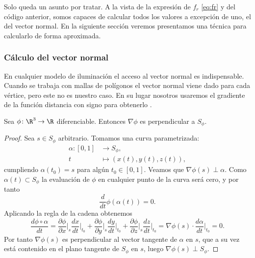 Solo queda un asunto por tratar. A la vista de la expresión de $f_r$ \eqref{eq:fr} y del código anterior, somos capaces de calcular todos los valores a excepción de uno, el del vector normal. En la siguiente sección veremos presentamos una técnica para calcularlo de forma aproximada. 

\subsubsection{Cálculo del vector normal}
En cualquier modelo de iluminación el acceso al vector normal es indispensable. Cuando se trabaja con mallas de polígonos el vector normal viene dado para cada vértice, pero este no es nuestro caso. En su lugar nosotros usaremos el gradiente de la función distancia con signo para obtenerlo \cite{harvard}.
\begin{proposicion}\label{p:gradient_perp}
  Sea $\phi\colon \R^3\to \R$ diferenciable. Entonces $\nabla\phi$ es perpendicular a $S_\phi$.
\end{proposicion}
\begin{proof}
  Sea $s\in S_\phi$ arbitrario. Tomamos una curva parametrizada:
  \begin{align*}
    \alpha \colon [0,1] & \to S_\phi,\\
    t                   & \mapsto \left(x(t), y(t), z(t) \right),
  \end{align*}
  cumpliendo $\alpha(t_0)=s$ para algún $t_0\in [0,1]$. Veamos que $\nabla\phi(s) \perp \alpha$. Como $ \alpha(t)\subset S_\phi$ la evaluación de $\phi$ en cualquier punto de la curva será cero, y por tanto
  \begin{equation*}
      \frac{d}{dt}\phi(\alpha(t)) = 0.
  \end{equation*}
  Aplicando la regla de la cadena obtenemos
  \begin{equation*}
       \frac{d\phi \circ \alpha}{dt} = \frac{\partial{\phi}}{\partial{x}}\bigg\rvert_s \frac{dx}{dt}\bigg\rvert_{t_0} + \frac{\partial{\phi}}{\partial{y}}\bigg\rvert_s\frac{dy}{dt}\bigg\rvert_{t_0} + \frac{\partial{\phi}}{\partial{z}}\bigg\rvert_s\frac{dz}{dt}\bigg\rvert_{t_0} = \nabla \phi (s) \cdot \frac{d\alpha}{dt}\bigg\rvert_{t_0} = 0.
  \end{equation*}
    Por tanto $\nabla\phi(s)$ es perpendicular al vector tangente de $\alpha$ en $s$, que a su vez está contenido en el plano tangente de $S_\phi$ en $s$, luego $\nabla\phi(s) \perp S_\phi$.
\end{proof}

